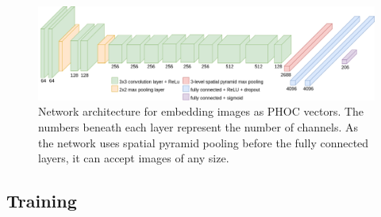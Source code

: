 \documentclass[ms,electronic,twosidetoc,letterpaper,chaptercenter,parttop,lol,lof,lot]{byumsphd}
\begin{document}
\begin{figure}[t]
    \centering
    \includegraphics[width=.98\textwidth]{thesis-phocnet}
    \caption{Network architecture for embedding images as PHOC vectors. The numbers beneath each layer represent the number of channels. As the network uses spatial pyramid pooling before the fully connected layers, it can accept images of any size.}
    \label{fig:network}
\end{figure}

\subsection{Training}
\end{document}
